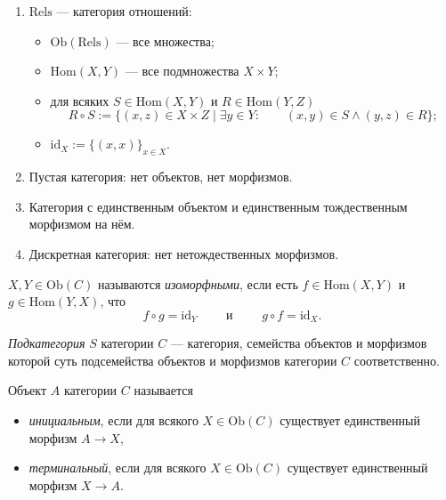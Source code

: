 \documentclass[12pt,a4paper]{article}
\newcommand{\Hom}{\mathrm{Hom}}
\newcommand{\Ob}{\mathrm{Ob}}
\newcommand{\id}{\mathrm{id}}
\newcommand{\Rels}{\mathrm{Rels}}
\begin{document}
\begin{example}
\begin{enumerate}
            \item $\Rels$ --- категория отношений:
                \begin{itemize}
                    \item $\Ob(\Rels)$ --- все множества;
                    \item $\Hom(X, Y)$ --- все подмножества $X \times Y$;
                    \item для всяких $S \in \Hom(X, Y)$ и $R \in \Hom(Y, Z)$
                        \[R \circ S := \{(x, z) \in X \times Z \mid \exists y \in Y: \qquad (x, y) \in S \wedge (y, z) \in R\};\]
                    \item $\id_X := \{(x, x)\}_{x \in X}$. 
                \end{itemize}
            \item Пустая категория: нет объектов, нет морфизмов.
            \item Категория с единственным объектом и единственным тождественным морфизмом на нём.
            \item Дискретная категория: нет нетождественных морфизмов.
        \end{enumerate}
    \end{example}

    \begin{definition}
        $X, Y \in \Ob(C)$ называются \emph{изоморфными}, если есть $f \in \Hom(X, Y)$ и $g \in \Hom(Y, X)$, что
        \[f \circ g = \id_Y \qquad \text{ и } \qquad g \circ f = \id_X.\]
    \end{definition}

    \begin{definition}
        \emph{Подкатегория} $S$ категории $C$ --- категория, семейства объектов и морфизмов которой суть подсемейства объектов и морфизмов категории $C$ соответственно.
    \end{definition}

    \begin{definition}
        Объект $A$ категории $C$ называется
        \begin{itemize}
            \item \emph{инициальным}, если для всякого $X \in \Ob(C)$ существует единственный морфизм $A \to X$,
            \item \emph{терминальный}, если для всякого $X \in \Ob(C)$ существует единственный морфизм $X \to A$.
        \end{itemize}
    \end{definition}
\end{document}
